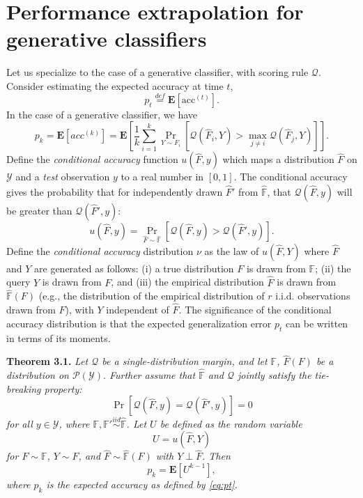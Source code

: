 \documentclass{article}
\newcommand{\E}{\textbf{E}}
\begin{document}
\section{Performance extrapolation for generative classifiers}

Let us specialize to the case of a generative classifier, with scoring rule $\mathcal{Q}$.
Consider estimating the expected accuracy at time $t$, 
\begin{equation}\label{eq:pt}
p_t \stackrel{def}{=} \E[\text{acc}^{(t)}].\end{equation}
In the case of a generative classifier, we have
\[
p_k = \E[acc^{(k)}] = \E\left[\frac{1}{k}\sum_{i=1}^k \Pr_{Y \sim F_i}[\mathcal{Q}(\hat{F}_i, Y) > \max_{j \neq i}\mathcal{Q}(\hat{F}_j, Y)]\right].
\]
Define the \emph{conditional accuracy} function $u(\hat{F}, y)$ which maps a
distribution $\hat{F}$ on $\mathcal{Y}$ and a \emph{test} observation $y$ to
a real number in $[0,1]$.  The conditional accuracy gives the
probability that for independently drawn $\hat{F}'$ from $\hat{\mathbb{F}}$, that
$\mathcal{Q}(\hat{F}, y)$ will be greater than $\mathcal{Q}(\hat{F}', y)$:
\[
u(\hat{F}, y) = \Pr_{\hat{F} \sim \hat{\mathbb{F}}}[\mathcal{Q}(\hat{F}, y) > \mathcal{Q}(\hat{F}', y)].
\]
Define the \emph{conditional accuracy} distribution $\nu$ as the law
of $u(\hat{F}, Y)$ where $\hat{F}$ and $Y$ are generated as follows:
(i) a true distribution $F$ is drawn from $\mathbb{F}$; (ii) the query $Y$ is drawn from $F$, 
and (iii) the empirical distribution $\hat{F}$ is drawn from $\hat{\mathbb{F}}(F)$ 
(e.g., the distribution of the empirical distribution of $r$ i.i.d. observations drawn from $F$),
with $Y$ independent of $\hat{F}$.  The significance of the conditional accuracy
distribution is that the expected generalization error $p_t$ can be
written in terms of its moments.

\noindent\textbf{Theorem 3.1.} \emph{
Let $\mathcal{Q}$ be a single-distribution margin, and let $\mathbb{F}$, $\hat{F}(F)$ be a distribution on $\mathcal{P}(\mathcal{Y}).$
Further assume that
$\hat{\mathbb{F}}$ and $\mathcal{Q}$ jointly satisfy the
\emph{tie-breaking} property:
\begin{equation}\label{eq:tie}
\Pr[\mathcal{Q}(\hat{F}, y) = \mathcal{Q}(\hat{F}', y)] = 0
\end{equation}
for all $y \in \mathcal{Y}$, where $\mathbb{F}, \mathbb{F}' \stackrel{iid}{\sim} \hat{\mathbb{F}}$.
Let $U$ be defined as the random variable
\[
U = u(\hat{F}, Y)
\]
for $F \sim \mathbb{F}$, $Y \sim F$, and $\hat{F} \sim \hat{\mathbb{F}}(F)$ with $Y \perp \hat{F}$.
Then \[p_k = \E[U^{k-1}],\]
where $p_k$ is the expected accuracy as defined by \eqref{eq:pt}.
}
\end{document}

